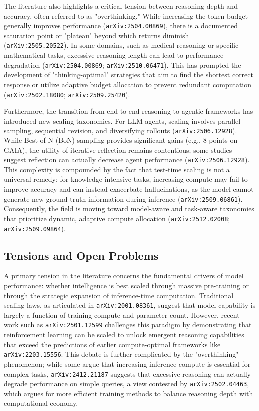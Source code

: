 \documentclass[11pt]{article}
\begin{document}
The literature also highlights a critical tension between reasoning depth and accuracy, often referred to as "overthinking." While increasing the token budget generally improves performance (\texttt{arXiv:2504.00869}), there is a documented saturation point or "plateau" beyond which returns diminish (\texttt{arXiv:2505.20522}). In some domains, such as medical reasoning or specific mathematical tasks, excessive reasoning length can lead to performance degradation (\texttt{arXiv:2504.00869}; \texttt{arXiv:2510.06471}). This has prompted the development of "thinking-optimal" strategies that aim to find the shortest correct response or utilize adaptive budget allocation to prevent redundant computation (\texttt{arXiv:2502.18080}; \texttt{arXiv:2509.25420}).

Furthermore, the transition from end-to-end reasoning to agentic frameworks has introduced new scaling taxonomies. For LLM agents, scaling involves parallel sampling, sequential revision, and diversifying rollouts (\texttt{arXiv:2506.12928}). While Best-of-N (BoN) sampling provides significant gains (e.g., 8 points on GAIA), the utility of iterative reflection remains contentious; some studies suggest reflection can actually decrease agent performance (\texttt{arXiv:2506.12928}). This complexity is compounded by the fact that test-time scaling is not a universal remedy; for knowledge-intensive tasks, increasing compute may fail to improve accuracy and can instead exacerbate hallucinations, as the model cannot generate new ground-truth information during inference (\texttt{arXiv:2509.06861}). Consequently, the field is moving toward model-aware and task-aware taxonomies that prioritize dynamic, adaptive compute allocation (\texttt{arXiv:2512.02008}; \texttt{arXiv:2509.09864}).

\subsection{Tensions and Open Problems}

A primary tension in the literature concerns the fundamental drivers of model performance: whether intelligence is best scaled through massive pre-training or through the strategic expansion of inference-time computation. Traditional scaling laws, as articulated in \texttt{arXiv:2001.08361}, suggest that model capability is largely a function of training compute and parameter count. However, recent work such as \texttt{arXiv:2501.12599} challenges this paradigm by demonstrating that reinforcement learning can be scaled to unlock emergent reasoning capabilities that exceed the predictions of earlier compute-optimal frameworks like \texttt{arXiv:2203.15556}. This debate is further complicated by the "overthinking" phenomenon; while some argue that increasing inference compute is essential for complex tasks, \texttt{arXiv:2412.21187} suggests that excessive reasoning can actually degrade performance on simple queries, a view contested by \texttt{arXiv:2502.04463}, which argues for more efficient training methods to balance reasoning depth with computational economy.
\end{document}
